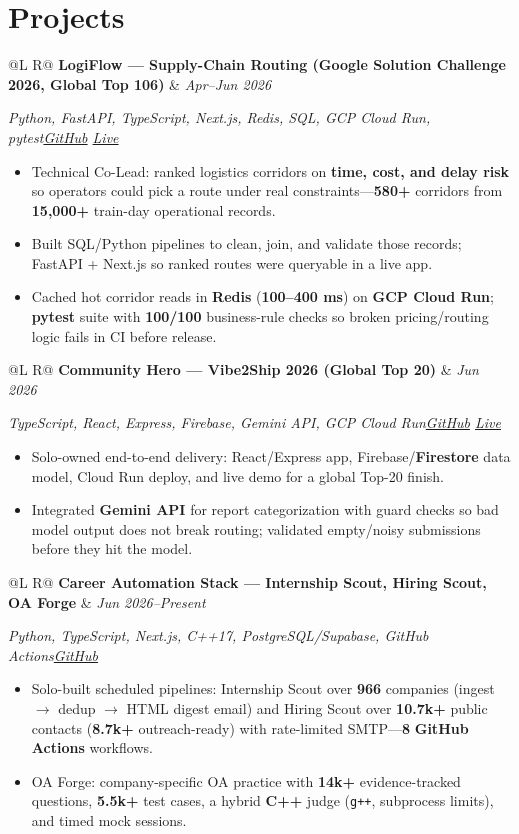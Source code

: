 \documentclass[a4paper,10pt]{article}
\makeatletter
\newcommand{\proj}[4]{%
  \vspace{1.6mm}
  \noindent\begin{tabularx}{\textwidth}{@{}L R@{}}
    \textbf{#1} & \textit{\small #2} \\
  \end{tabularx}\par
  {\small\textit{#3}\hfill\textit{#4}}\par
  \vspace{0.5mm}%
}
\makeatother
\begin{document}
\section{Projects}
\proj{LogiFlow --- Supply-Chain Routing (Google Solution Challenge 2026, Global Top 106)}{Apr--Jun 2026}
{Python, FastAPI, TypeScript, Next.js, Redis, SQL, GCP Cloud Run, pytest}
{\href{https://github.com/Ojas-Srivastava05/LogiFlow-Solution-Challenge-2026}{GitHub} \textbar{} \href{https://logi-flow-solution-challenge-2026.vercel.app}{Live}}
\begin{itemize}
  \item Technical Co-Lead: ranked logistics corridors on \textbf{time, cost, and delay risk} so operators could pick a route under real constraints---\textbf{580+} corridors from \textbf{15,000+} train-day operational records.
  \item Built SQL/Python pipelines to clean, join, and validate those records; FastAPI + Next.js so ranked routes were queryable in a live app.
  \item Cached hot corridor reads in \textbf{Redis} (\textbf{100--400 ms}) on \textbf{GCP Cloud Run}; \textbf{pytest} suite with \textbf{100/100} business-rule checks so broken pricing/routing logic fails in CI before release.
\end{itemize}

\proj{Community Hero --- Vibe2Ship 2026 (Global Top 20)}{Jun 2026}
{TypeScript, React, Express, Firebase, Gemini API, GCP Cloud Run}
{\href{https://github.com/Ojas-Srivastava05/community-hero}{GitHub} \textbar{} \href{https://community-hero-987477089222.asia-south1.run.app}{Live}}
\begin{itemize}
  \item Solo-owned end-to-end delivery: React/Express app, Firebase/\textbf{Firestore} data model, Cloud Run deploy, and live demo for a global Top-20 finish.
  \item Integrated \textbf{Gemini API} for report categorization with guard checks so bad model output does not break routing; validated empty/noisy submissions before they hit the model.
\end{itemize}

\proj{Career Automation Stack --- Internship Scout, Hiring Scout, OA Forge}{Jun 2026--Present}
{Python, TypeScript, Next.js, C++17, PostgreSQL/Supabase, GitHub Actions}
{\href{https://github.com/Ojas-Srivastava05/automation-workflows}{GitHub}}
\begin{itemize}
  \item Solo-built scheduled pipelines: Internship Scout over \textbf{966} companies (ingest $\to$ dedup $\to$ HTML digest email) and Hiring Scout over \textbf{10.7k+} public contacts (\textbf{8.7k+} outreach-ready) with rate-limited SMTP---\textbf{8} \textbf{GitHub Actions} workflows.
  \item OA Forge: company-specific OA practice with \textbf{14k+} evidence-tracked questions, \textbf{5.5k+} test cases, a hybrid \textbf{C++} judge (\texttt{g++}, subprocess limits), and timed mock sessions.
\end{itemize}
\end{document}
